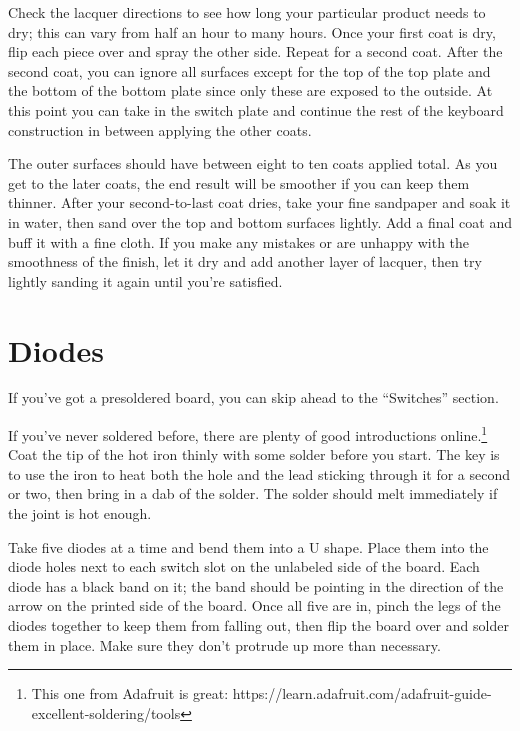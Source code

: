\documentclass[landscape,twocolumn]{article}
\begin{document}
\vspace{1em}

Check the lacquer directions to see how long your particular product
needs to dry; this can vary from half an hour to many hours. Once your
first coat is dry, flip each piece over and spray the other
side. Repeat for a second coat. After the second coat, you can ignore
all surfaces except for the top of the top plate and the bottom of the
bottom plate since only these are exposed to the outside. At this
point you can take in the switch plate and continue the rest of the
keyboard construction in between applying the other coats.

\vspace{1em}

The outer surfaces should have between eight to ten coats applied
total. As you get to the later coats, the end result will be smoother
if you can keep them thinner. After your second-to-last coat dries,
take your fine sandpaper and soak it in water, then sand over the top
and bottom surfaces lightly. Add a final coat and buff it with a fine
cloth. If you make any mistakes or are unhappy with the smoothness of
the finish, let it dry and add another layer of lacquer, then try
lightly sanding it again until you're satisfied.

\section{Diodes}

If you've got a presoldered board, you can skip ahead to the
``Switches'' section.

\vspace {1em}

If you've never soldered before, there are plenty of good
introductions online.\footnote{This one from Adafruit is great:
  https://learn.adafruit.com/adafruit-guide-excellent-soldering/tools}
Coat the tip of the hot iron thinly with some solder before you
start. The key is to use the iron to heat both the hole and the lead
sticking through it for a second or two, then bring in a dab of the
solder. The solder should melt immediately if the joint is hot enough.

\vspace{1em}

Take five diodes at a time and bend them into a U shape. Place them
into the diode holes next to each switch slot on the unlabeled side of
the board. Each diode has a black band on it; the band should be
pointing in the direction of the arrow on the printed side of
the board. Once all five are in, pinch the legs of the diodes together
to keep them from falling out, then flip the board over and solder
them in place. Make sure they don't protrude up more than necessary.
\end{document}
